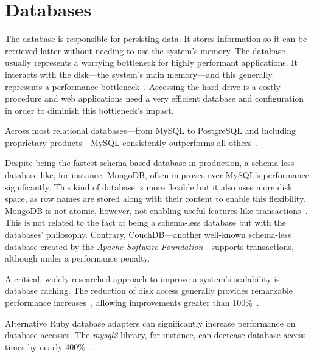 \section{Databases} %
\label{state:sec:databases}
The database is responsible for persisting data. It stores information so it can be retrieved latter without needing to use the system's memory.
The database usually represents a worrying bottleneck for highly performant applications. It interacts with the disk---the system's main memory---and this generally represents a performance bottleneck~\cite{memory_wall}. Accessing the hard drive is a costly procedure and web applications need a very efficient database and configuration in order to diminish this bottleneck's impact.

Across most relational databases---from MySQL to PostgreSQL and including proprietary products---MySQL consistently outperforms all others~\cite{benchmark_relational_databases}.

Despite being the fastest schema-based database in production, a schema-less database like, for instance, MongoDB, often improves over MySQL's performance significantly. This kind of database is more flexible but it also uses more disk space, as row names are stored along with their content to enable this flexibility. MongoDB is not atomic, however, not enabling useful features like transactions~\cite{mysql_to_mongodb}. This is not related to the fact of being a schema-less database but with the databases' philosophy. Contrary, CouchDB---another well-known schema-less database created by the \textit{Apache Software Foundation}---supports transactions, although under a performance penalty.

A critical, widely researched approach to improve a system's scalability is database caching. The reduction of disk access generally provides remarkable performance increases~\cite{scaling_rails_bottomup}, allowing improvements greater than 100\%~\cite{rapid_prototyping_mdd,high_performance_database_caching}.

Alternative Ruby database adapters can significantly increase performance on database accesses. The \textit{mysql2} library, for instance, can decrease database access times by nearly 400\%~\cite{brianmario_mysql2}.

